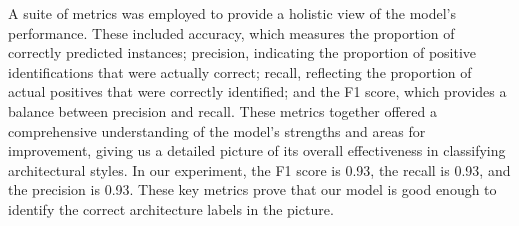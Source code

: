 \documentclass{article}
\begin{document}
A suite of metrics was employed to provide a holistic view of the model's performance. These included accuracy, which measures the proportion of correctly predicted instances; precision, indicating the proportion of positive identifications that were actually correct; recall, reflecting the proportion of actual positives that were correctly identified; and the F1 score, which provides a balance between precision and recall. These metrics together offered a comprehensive understanding of the model's strengths and areas for improvement, giving us a detailed picture of its overall effectiveness in classifying architectural styles. In our experiment, the F1 score is 0.93, the recall is 0.93, and the precision is 0.93. These key metrics prove that our model is good enough to identify the correct architecture labels in the picture.
\end{document}
